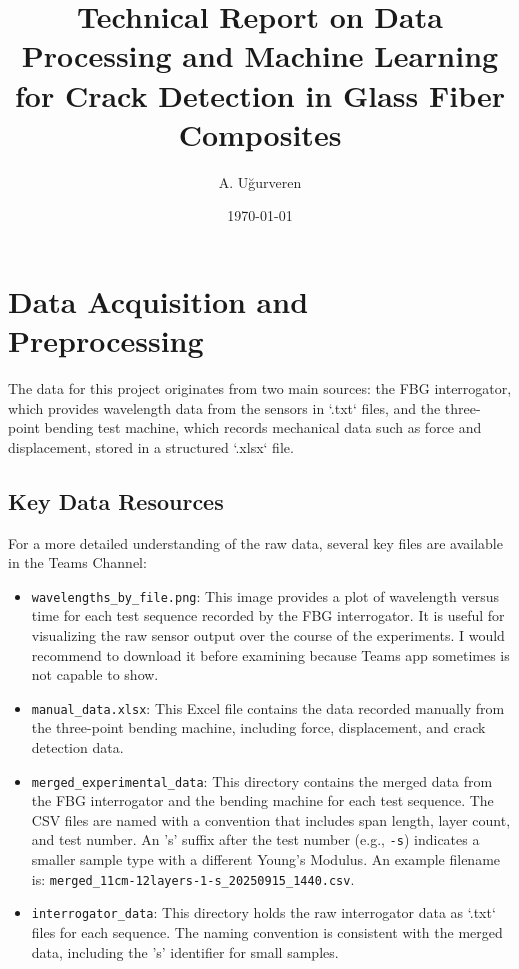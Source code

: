 \documentclass{article}
\title{Technical Report on Data Processing and Machine Learning for Crack Detection in Glass Fiber Composites}
\author{A. Uğurveren}
\date{\today}
\begin{document}
\maketitle

\section{Data Acquisition and Preprocessing}

The data for this project originates from two main sources: the FBG interrogator, which provides wavelength data from the sensors in `.txt` files, and the three-point bending test machine, which records mechanical data such as force and displacement, stored in a structured `.xlsx` file.

\subsection{Key Data Resources}
For a more detailed understanding of the raw data, several key files are available in the Teams Channel:
\begin{itemize}
    \item \texttt{wavelengths\_by\_file.png}: This image provides a plot of wavelength versus time for each test sequence recorded by the FBG interrogator. It is useful for visualizing the raw sensor output over the course of the experiments. I would recommend to download it before examining because Teams app sometimes is not capable to show.
    \item \texttt{manual\_data.xlsx}: This Excel file contains the data recorded manually from the three-point bending machine, including force, displacement, and crack detection data.
    \item \texttt{merged\_experimental\_data}: This directory contains the merged data from the FBG interrogator and the bending machine for each test sequence. The CSV files are named with a convention that includes span length, layer count, and test number. An 's' suffix after the test number (e.g., \texttt{-s}) indicates a smaller sample type with a different Young's Modulus. An example filename is: \texttt{merged\_11cm-12layers-1-s\_20250915\_1440.csv}.
    \item \texttt{interrogator\_data}: This directory holds the raw interrogator data as `.txt` files for each sequence. The naming convention is consistent with the merged data, including the 's' identifier for small samples.
\end{itemize}
\end{document}
